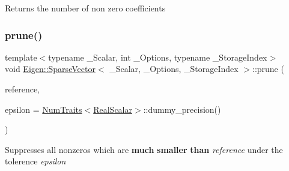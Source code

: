 \begin{DoxyReturn}{Returns}
the number of non zero coefficients 
\end{DoxyReturn}
\mbox{\label{class_eigen_1_1_sparse_vector_af094e30271da69f865b5d97f338f81d1}} 
\subsubsection{\texorpdfstring{prune()}{prune()}}
{\footnotesize\ttfamily template$<$typename \+\_\+\+Scalar, int \+\_\+\+Options, typename \+\_\+\+Storage\+Index$>$ \\
void \mbox{\hyperlink{class_eigen_1_1_sparse_vector}{Eigen\+::\+Sparse\+Vector}}$<$ \+\_\+\+Scalar, \+\_\+\+Options, \+\_\+\+Storage\+Index $>$\+::prune (\begin{DoxyParamCaption}\item[{const Scalar \&}]{reference,  }\item[{const \mbox{\hyperlink{class_eigen_1_1_sparse_matrix_base_aaec8ace6efb785c81d442931c3248d88}{Real\+Scalar}} \&}]{epsilon = {\ttfamily \mbox{\hyperlink{struct_eigen_1_1_num_traits}{Num\+Traits}}$<$\mbox{\hyperlink{class_eigen_1_1_sparse_matrix_base_aaec8ace6efb785c81d442931c3248d88}{Real\+Scalar}}$>$\+:\+:dummy\+\_\+precision()} }\end{DoxyParamCaption})\hspace{0.3cm}{\ttfamily [inline]}}





Suppresses all nonzeros which are {\bfseries{much}} {\bfseries{smaller}} {\bfseries{than}} {\itshape reference} under the tolerence {\itshape epsilon} \mbox{\label{class_eigen_1_1_sparse_vector_a594675dd305845e55edcab61c1b21d33}} 
